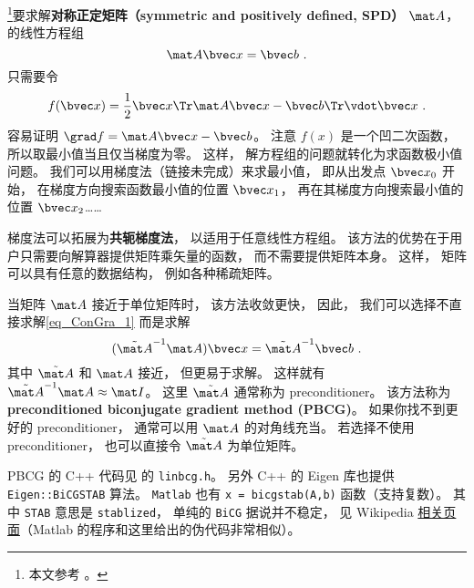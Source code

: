 
\begin{issues}
\issueDraft
\end{issues}


\footnote{本文参考 \cite{NR3}。}要求解\textbf{对称正定矩阵（symmetric and positively defined, SPD）} $\mat A$， 的线性方程组
\begin{equation}\label{eq_ConGra_1}
\mat A \bvec x = \bvec b~.
\end{equation}
只需要令
\begin{equation}
f(\bvec x) = \frac{1}{2}\bvec x\Tr \mat A\bvec x - \bvec b\Tr \vdot \bvec x~.
\end{equation}
容易证明 $\grad f = \mat A \bvec x - \bvec b$。 注意 $f(x)$ 是一个凹二次函数， 所以取最小值当且仅当梯度为零。 这样， 解方程组的问题就转化为求函数极小值问题。 我们可以用梯度法（链接未完成）来求最小值， 即从出发点 $\bvec x_0$ 开始， 在梯度方向搜索函数最小值的位置 $\bvec x_1$， 再在其梯度方向搜索最小值的位置 $\bvec x_2$……

梯度法可以拓展为\textbf{共轭梯度法}， 以适用于任意线性方程组。 该方法的优势在于用户只需要向解算器提供矩阵乘矢量的函数， 而不需要提供矩阵本身。 这样， 矩阵可以具有任意的数据结构， 例如各种稀疏矩阵。

当矩阵 $\mat A$ 接近于单位矩阵时， 该方法收敛更快， 因此， 我们可以选择不直接求解\autoref{eq_ConGra_1} 而是求解
\begin{equation}
(\tilde {\mat A}^{-1}\mat A) \bvec x = \tilde {\mat A}^{-1}\bvec b~.
\end{equation}
其中 $\tilde {\mat A}$ 和 $\mat A$ 接近， 但更易于求解。 这样就有 $\tilde {\mat A}^{-1}\mat A \approx \mat I$。 这里 $\tilde {\mat A}$ 通常称为 preconditioner。 该方法称为 \textbf{preconditioned biconjugate gradient method (PBCG)}。 如果你找不到更好的 preconditioner， 通常可以用 $\mat A$ 的对角线充当。 若选择不使用 preconditioner， 也可以直接令 $\tilde {\mat A}$ 为单位矩阵。

PBCG 的 C++ 代码见 \cite{NR3} 的 \verb|linbcg.h|。 另外 C++ 的 Eigen 库也提供 \verb|Eigen::BiCGSTAB| 算法。 \verb|Matlab| 也有 \verb|x = bicgstab(A,b)| 函数（支持复数）。 其中 \verb|STAB| 意思是 \verb|stablized|， 单纯的 \verb|BiCG| 据说并不稳定， 见 Wikipedia \href{https://en.wikipedia.org/wiki/Biconjugate_gradient_stabilized_method}{相关页面}（Matlab 的程序和这里给出的伪代码非常相似）。
